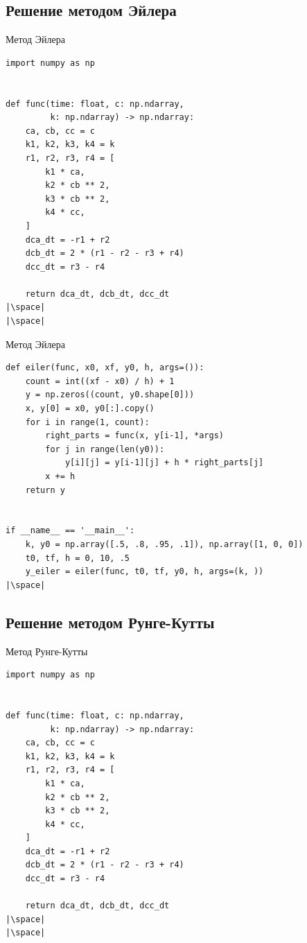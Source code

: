 \documentclass[aspectratio=169, mathserif]{beamer}	%
\begin{document}
\subsection{Решение методом Эйлера}
\begin{frame}[fragile, ]{Метод Эйлера}
\scriptsize
\begin{verbatim}
import numpy as np


def func(time: float, c: np.ndarray,
         k: np.ndarray) -> np.ndarray:
    ca, cb, cc = c
    k1, k2, k3, k4 = k
    r1, r2, r3, r4 = [
        k1 * ca,
        k2 * cb ** 2,
        k3 * cb ** 2,
        k4 * cc,
    ]
    dca_dt = -r1 + r2
    dcb_dt = 2 * (r1 - r2 - r3 + r4)
    dcc_dt = r3 - r4

    return dca_dt, dcb_dt, dcc_dt
|\space|
|\space|
\end{verbatim}
\vfill
\end{frame}


\begin{frame}[fragile, ]{Метод Эйлера}
\scriptsize
\begin{verbatim}
def eiler(func, x0, xf, y0, h, args=()):
    count = int((xf - x0) / h) + 1
    y = np.zeros((count, y0.shape[0]))
    x, y[0] = x0, y0[:].copy()
    for i in range(1, count):
        right_parts = func(x, y[i-1], *args)
        for j in range(len(y0)):
            y[i][j] = y[i-1][j] + h * right_parts[j]
        x += h
    return y


if __name__ == '__main__':
    k, y0 = np.array([.5, .8, .95, .1]), np.array([1, 0, 0])
    t0, tf, h = 0, 10, .5
    y_eiler = eiler(func, t0, tf, y0, h, args=(k, ))
|\space|
\end{verbatim}
\vfill
\end{frame}


\subsection{Решение методом Рунге-Кутты}
\begin{frame}[fragile, ]{Метод Рунге-Кутты}
\scriptsize
\begin{verbatim}
import numpy as np


def func(time: float, c: np.ndarray,
         k: np.ndarray) -> np.ndarray:
    ca, cb, cc = c
    k1, k2, k3, k4 = k
    r1, r2, r3, r4 = [
        k1 * ca,
        k2 * cb ** 2,
        k3 * cb ** 2,
        k4 * cc,
    ]
    dca_dt = -r1 + r2
    dcb_dt = 2 * (r1 - r2 - r3 + r4)
    dcc_dt = r3 - r4

    return dca_dt, dcb_dt, dcc_dt
|\space|
|\space|
\end{verbatim}
\vfill
\end{frame}
\end{document}
